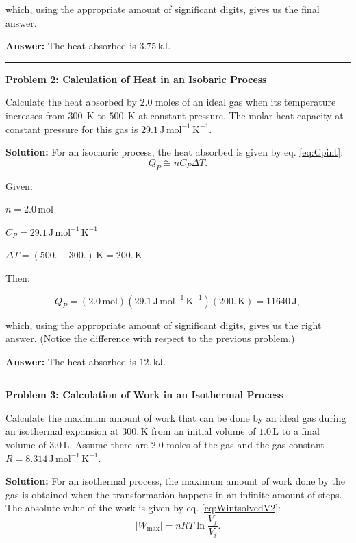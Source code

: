 \documentclass[
  9pt,
]{extbook}
\theoremstyle{definition}
\theoremstyle{definition}
\theoremstyle{definition}
\theoremstyle{definition}
\theoremstyle{remark}
\begin{document}
which, using the appropriate amount of significant digits, gives us the final answer.

\textbf{Answer:} The heat absorbed is \(3.75\,\text{kJ}.\)

\begin{center}\rule{0.5\linewidth}{0.5pt}\end{center}

\textbf{Problem 2: Calculation of Heat in an Isobaric Process}

Calculate the heat absorbed by 2.0 moles of an ideal gas when its temperature increases from \(300. \,\text{K}\) to \(500. \,\text{K}\) at constant pressure. The molar heat capacity at constant pressure for this gas is \(29.1 \, \text{J} \, \text{mol}^{-1} \, \text{K}^{-1}\).

\textbf{Solution:} For an isochoric process, the heat absorbed is given by eq. \eqref{eq:Cpint}: \[  Q_P \cong n C_P \Delta T.\]

Given:

\(n=2.0\,\text{mol}\)

\(C_P =29.1 \, \text{J} \, \text{mol}^{-1} \, \text{K}^{-1}\)

\(\Delta T= (500.-300.)\,\text{K}=200.\,\text{K}\)

Then:

\[Q_P=(2.0\,\text{mol})(29.1\,\text{J} \, \text{mol}^{-1} \, \text{K}^{-1})(200.\,\text{K}) = 11640\,\text{J},\]

which, using the appropriate amount of significant digits, gives us the right answer. (Notice the difference with respect to the previous problem.)

\textbf{Answer:} The heat absorbed is \(12.\, \text{kJ}.\)

\begin{center}\rule{0.5\linewidth}{0.5pt}\end{center}

\textbf{Problem 3: Calculation of Work in an Isothermal Process}

Calculate the maximum amount of work that can be done by an ideal gas during an isothermal expansion at \(300.\, \text{K}\) from an initial volume of \(1.0\,\text{L}\) to a final volume of \(3.0\,\text{L}\). Assume there are 2.0 moles of the gas and the gas constant \(R=8.314\, \text{J} \, \text{mol}^{-1} \, \text{K}^{-1}\).

\textbf{Solution:} For an isothermal process, the maximum amount of work done by the gas is obtained when the transformation happens in an infinite amount of steps. The absolute value of the work is given by eq. \eqref{eq:WintsolvedV2}: \[  \left| W_{\text{max}} \right| = nRT \ln \frac{V_f}{V_i}.\]
\end{document}
